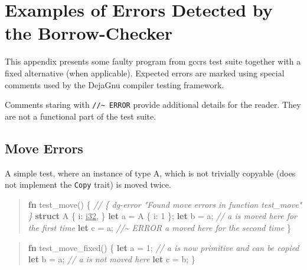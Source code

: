 \documentclass[
  11pt,
  twoside]{report}
\newenvironment{Shaded}{}{}
\newcommand{\CommentTok}[1]{\textit{#1}}
\newcommand{\DataTypeTok}[1]{\underline{#1}}
\newcommand{\DecValTok}[1]{#1}
\newcommand{\KeywordTok}[1]{\textbf{#1}}
\newcommand{\NormalTok}[1]{#1}
\newcommand{\OperatorTok}[1]{#1}
\begin{document}
\cleardoublepage

\chapter{Examples of Errors Detected by the
Borrow-Checker}\label{sec:errors}

This appendix presents some faulty program from gccrs test suite
together with a fixed alternative (when applicable). Expected errors are
marked using special comments used by the DejaGnu compiler testing
framework.

Comments staring with \texttt{//\textasciitilde{}\ ERROR} provide
additional details for the reader. They are not a functional part of the
test suite.

\section{Move Errors}\label{sec:move-errors}

A simple test, where an instance of type A, which is not trivially
copyable (does not implement the \texttt{Copy} trait) is moved twice.

\begin{quote}
\begin{Shaded}
\begin{Highlighting}[]
\KeywordTok{fn}\NormalTok{ test\_move() }\OperatorTok{\{}
    \CommentTok{// \{ dg{-}error "Found move errors in function test\_move" \}}
    \KeywordTok{struct}\NormalTok{ A }\OperatorTok{\{}
\NormalTok{        i}\OperatorTok{:} \DataTypeTok{i32}\OperatorTok{,}
    \OperatorTok{\}}
    \KeywordTok{let}\NormalTok{ a }\OperatorTok{=}\NormalTok{ A }\OperatorTok{\{}\NormalTok{ i}\OperatorTok{:} \DecValTok{1} \OperatorTok{\};}
    \KeywordTok{let}\NormalTok{ b }\OperatorTok{=}\NormalTok{ a}\OperatorTok{;} \CommentTok{// a is moved here for the first time}
    \KeywordTok{let}\NormalTok{ c }\OperatorTok{=}\NormalTok{ a}\OperatorTok{;} \CommentTok{//\textasciitilde{} ERROR \textasciigrave{}a\textasciigrave{} moved here for the second time}
\OperatorTok{\}}
\end{Highlighting}
\end{Shaded}
\end{quote}

\begin{quote}
\begin{Shaded}
\begin{Highlighting}[]
\KeywordTok{fn}\NormalTok{ test\_move\_fixed() }\OperatorTok{\{}
    \KeywordTok{let}\NormalTok{ a }\OperatorTok{=} \DecValTok{1}\OperatorTok{;} \CommentTok{// \textasciigrave{}a\textasciigrave{} is now primitive and can be copied}
    \KeywordTok{let}\NormalTok{ b }\OperatorTok{=}\NormalTok{ a}\OperatorTok{;} \CommentTok{// \textasciigrave{}a\textasciigrave{} is not moved here}
    \KeywordTok{let}\NormalTok{ c }\OperatorTok{=}\NormalTok{ b}\OperatorTok{;}
\OperatorTok{\}}
\end{Highlighting}
\end{Shaded}
\end{quote}
\end{document}
